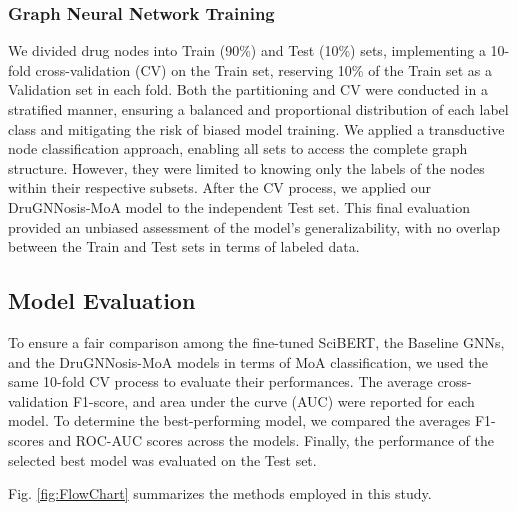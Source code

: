 \documentclass[journal,twoside,web]{ieeecolor}
\begin{document}
\subsubsection{Graph Neural Network Training}
\label{sec:Train}
We divided drug nodes into Train (90\%) and Test (10\%) sets, implementing a 10-fold cross-validation (CV) on the Train set, reserving 10\% of the Train set as a Validation set in each fold.
Both the partitioning and CV were conducted in a stratified manner, ensuring a balanced and proportional distribution of each label class and mitigating the risk of biased model training.
We applied a transductive node classification approach, enabling all sets to access the complete graph structure.
However, they were limited to knowing only the labels of the nodes within their respective subsets.
After the CV process, we applied our DruGNNosis-MoA model to the independent Test set.
This final evaluation provided an unbiased assessment of the model’s generalizability, with no overlap between the Train and Test sets in terms of labeled data.


\subsection{Model Evaluation}
To ensure a fair comparison among the fine-tuned SciBERT, the Baseline GNNs, and the DruGNNosis-MoA models in terms of MoA classification, we used the same 10-fold CV process to evaluate their performances.
The average cross-validation F1-score, and area under the curve (AUC) were reported for each model.
To determine the best-performing model, we compared the averages F1-scores and ROC-AUC scores across the models.
Finally, the performance of the selected best model was evaluated on the Test set.

Fig. \ref{fig:FlowChart} summarizes the methods employed in this study.
\end{document}
